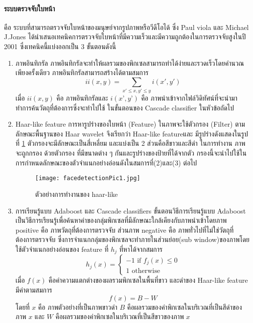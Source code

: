 \paragraph{\textbf{ระบบตรวจจับใบหน้า}} \label{facedetect}
คือ ระบบที่สามารถตรวจจับใบหน้าของมนุษย์จากรูปภาพหรือวีดีโอได้ ซึ่ง Paul viola และ Michael J.Jones ได้นำเสนอเทคนิคการตรวจจับใบหน้าที่มีความเร็วและมีความถูกต้องในการตรวจจับสูงในปี 2001 ซึ่งเทคนิคนี้แบ่งออกเป็น 3 ขั้นตอนดังนี้
\begin{enumerate}
\item ภาพอินทิกรัล
  ภาพอินทิกรัลจะทำให้ผลรวมของพิกเซลสามารถทำได้ง่ายและรวดเร็วโดยคำนวณเพียงครั้งเดียว ภาพอินทิกรัลสามารถสร้างได้ตามสมการ
  \[ ii(x,y) = \sum_{x'\leq x, y' \leq y} i(x',y') \]
  เมื่อ $ii(x,y)$ คือ ภาพอินทิกรัลและ $i(x’,y’)$ คือ ภาพนำเข้าจากไฟล์วิดิทัศน์ที่จะนำมาทำการค้นวัตถุที่ต้องการซึ่งจะทำไปใช้ ในขั้นตอนของ Cascade classifier ในหัวข้อถัดไป
\item Haar-like feature
  การหารูปร่างของใบหน้า (Feature) ในภาพจะใช้ตัวกรอง (Filter) ตาม ลักษณะพื้นฐานของ Haar wavelet จึงเรียกว่า Haar-like featureและ มีรูปร่างดังแสดงในรูปที่ \ref{fig:facedetectionPic1} ตัวกรองจะมีลักษณะเป็นสี่เหลี่ยม และแบ่งเป็น 2 ส่วนคือสีขาวและสีดํา ในการทํางาน ภาพจะถูกกรอง ด้วยตัวกรอง ที่มีขนาดต่าง ๆ กันและรูปร่างของป้ายที่ได้จากตัว กรองนี้จะนําไปใช้ในการกําหนดลักษณะของตัวจําแนกอย่างอ่อนดังในสมการที่(2)และ(3) ต่อไป
   \begin{center}
 \begin{figure}[h!]
  \centerline{
    \texttt{[image: facedetectionPic1.jpg]}
    }
  \centering
  \caption{ตัวอย่างการทำงานของ haar-like}
  \label{fig:facedetectionPic1}
  \hrulefill
\end{figure}
   \end{center}
\item การเรียนรู้แบบ Adaboost และ Cascade classifiers
  ขั้นตอนวิธีการเรียนรู้แบบ Adaboost  เป็นวิธีการเรียนรู้เพื่อค้นหาค่าของกลุ่มพิกเซลที่มีลักษณะใกล้เคียงกับภาพนำเข้าโดยภาพ positive คือ  ภาพวัตถุที่ต้องการตรวจจับ ส่วนภาพ negative คือ ภาพทั่วไปที่ไม่ใช่วัตถุที่ต้องการตรวจจับ ซึ่งการจำแนกกลุ่มของพิกเซลจะทำภายในส่วนย่อย(sub window)ของภาพโดยใช้ตัวจำแนกอย่างอ่อนของ feature ที่ $h_j$ ที่หาได้จากสมการ
  \begin{equation*}
    h_j(x) = \begin{cases}
      -1 \text{ if $f_j(x) \leq 0$} \\
      1 \text{ otherwise}
      \end{cases}
  \end{equation*}
  เมื่อ $f(x)$ คือค่าความแตกต่างของผลรวมพิกเซลในพื้นที่ขาว และดําของ Haar-like feature มีค่าตามสมการ
  \[ f(x) = B - W \]
โดยที่ $x$ คือ ภาพตัวอย่างที่เป็นภาพขาวดำ $B$ คือผลรวมของค่าพิกเซลในบริเวณที่เป็นสีดำของภาพ $x$ และ $W$ คือผลรวมของค่าพิกเซลในบริเวณที่เป็นสีขาวของภาพ $x$


\end{enumerate}
